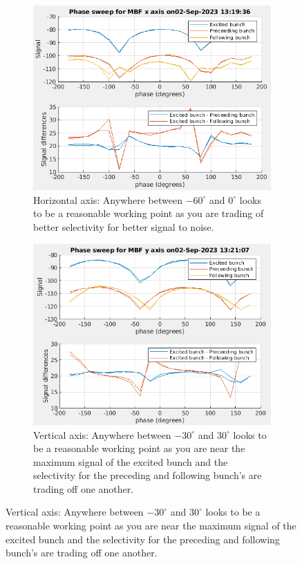 \documentclass{report}
\begin{document}
\begin{figure}[hbt]
   \centering
    \begin{subfigure}[b]{0.45\textwidth}
        \includegraphics[width=\textwidth]{vlr_system_phase_scan_x.png}
        \caption{Horizontal axis: Anywhere between $-60^\circ$ and $0^\circ$ looks to be a reasonable working point as you are trading of better selectivity for better signal to noise.}
        \label{fig:frontend_system_phase_scan_x}
    \end{subfigure}
    \begin{subfigure}[b]{0.45\textwidth}
        \includegraphics[width=\textwidth]{vlr_system_phase_scan_y.png}
        \caption{Vertical axis: Anywhere between $-30^\circ$ and $30^\circ$ looks to be a reasonable working point as you are near the maximum signal of the excited bunch and the selectivity for the preceding and following bunch's are trading off one another.}
        \label{fig:frontend_system_phase_scan_y}
    \end{subfigure}
    

\end{figure}
\end{document}
